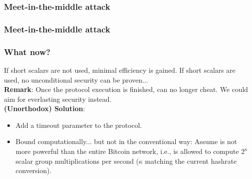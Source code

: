 \documentclass{beamer}
\begin{document}
\begin{frame}
    \frametitle{Meet-in-the-middle attack}
    
\end{frame}

\begin{frame}
    \frametitle{Meet-in-the-middle attack}
    
\end{frame}

\begin{frame}
    \frametitle{What now?}
    \small
    \pause
    If short scalars are not used, minimal efficiency is gained. If short scalars are used, no unconditional security can be proven... 
    \\
    \pause
    \vspace{1em}
    \textbf{Remark}: Once the protocol execution is finished, \adversary can no longer cheat. We could aim for everlasting security instead.
    \\
    \pause
    \vspace{1em}
    \textbf{(Unorthodox) Solution}: 
    \pause
    \begin{itemize}
        \item Add a timeout parameter to the protocol.
        \pause
        \item Bound \adversary computationally... but not in the conventional way: Assume \adversary is not more powerful than the entire Bitcoin network, i.e., \adversary is allowed to compute $2^\kappa$ scalar group multiplications per second ($\kappa$ matching the current hashrate conversion).
    \end{itemize}  
\end{frame}
\end{document}
